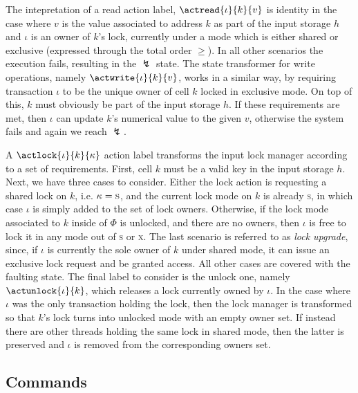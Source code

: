 The intepretation of a read action label, $\actread{\iota}{k}{v}$ is identity in the case where $v$ is the value associated to address $k$ as part of the input storage $h$ and $\iota$ is an owner of $k$'s lock, currently under a mode which is either shared or exclusive (expressed through the total order $\geq$). In all other scenarios the execution fails, resulting in the $\lightning$ state. The state transformer for write operations, namely $\actwrite{\iota}{k}{v}$, works in a similar way, by requiring transaction $\iota$ to be the unique owner of cell $k$ locked in exclusive mode. On top of this, $k$ must obviously be part of the input storage $h$. If these requirements are met, then $\iota$ can update $k$'s numerical value to the given $v$, otherwise the system fails and again we reach $\lightning$.

A $\actlock{\iota}{k}{\kappa}$ action label transforms the input lock manager according to a set of requirements. First, cell $k$ must be a valid key in the input storage $h$. Next, we have three cases to consider. Either the lock action is requesting a shared lock on $k$, i.e. $\kappa = \textsc{s}$, and the current lock mode on $k$ is already \textsc{s}, in which case $\iota$ is simply added to the set of lock owners. Otherwise, if the lock mode associated to $k$ inside of $\Phi$ is unlocked, and there are no owners, then $\iota$ is free to lock it in any mode out of \textsc{s} or \textsc{x}. The last scenario is referred to as \textit{lock upgrade}, since, if $\iota$ is currently the sole owner of $k$ under shared mode, it can issue an exclusive lock request and be granted access. All other cases are covered with the faulting state. The final label to consider is the unlock one, namely $\actunlock{\iota}{k}$, which releases a lock currently owned by $\iota$. In the case where $\iota$ was the only transaction holding the lock, then the lock manager is transformed so that $k$'s lock turns into unlocked mode with an empty owner set. If instead there are other threads holding the same lock in shared mode, then the latter is preserved and $\iota$ is removed from the corresponding owners set.

\tocless\subsection{Commands}

\label{sec:opSemCmd2pl}
	
